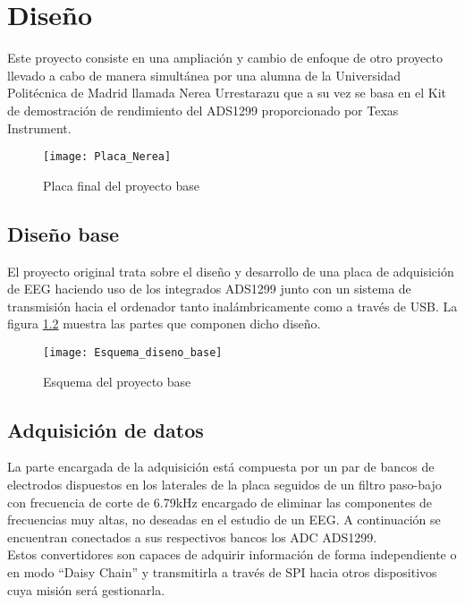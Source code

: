 \chapter{Diseño\label{sec:diseño}}

Este proyecto consiste en una ampliación y cambio de enfoque de otro proyecto llevado a cabo de manera simultánea por una alumna de la Universidad Politécnica de Madrid llamada Nerea Urrestarazu que a su vez se basa en el Kit de demostración de rendimiento del ADS1299 proporcionado por Texas Instrument.

\begin{figure} [h]
    \centering
    \texttt{[image: Placa\_Nerea]}
    \caption{Placa final del proyecto base}
    \label{fig:Placa_base}
\end{figure}

\section{Diseño base\label{sec:Diseno_base_N}}

El proyecto original trata sobre el diseño y desarrollo de una placa de adquisición de EEG haciendo uso de los integrados ADS1299 junto con un sistema de transmisión hacia el ordenador tanto inalámbricamente como a través de USB. La figura \ref{fig:Diseno_base} muestra las partes que componen dicho diseño.

\begin{figure} [h]
    \centering
    \texttt{[image: Esquema\_diseno\_base]}
    \caption{Esquema del proyecto base}
    \label{fig:Diseno_base}
\end{figure}

\section{Adquisición de datos\label{sec:Adquisicion_N}}

La parte encargada de la adquisición está compuesta por un par de bancos de electrodos dispuestos en los laterales de la placa seguidos de un filtro paso-bajo con frecuencia de corte de 6.79kHz encargado de eliminar las componentes de frecuencias muy altas, no deseadas en el estudio de un \gls{EEG}. A continuación se encuentran conectados a sus respectivos bancos los \gls{ADC} ADS1299. 
\\Estos convertidores son capaces de adquirir información de forma independiente o en modo ``Daisy Chain'' y transmitirla a través de \gls{SPI} hacia otros dispositivos cuya misión será gestionarla.

